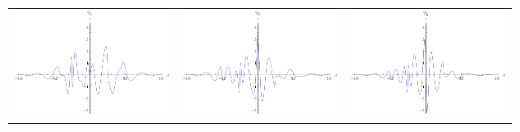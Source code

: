 \documentclass{article}
\begin{document}
\begin{landscape}
\begin{tabular}{ccc}
\includegraphics[width=6.7cm]{octic_wavelet_4.pdf}& \includegraphics[width=6.7cm]{octic_wavelet_5.pdf}& \includegraphics[width=6.7cm]{octic_wavelet_6.pdf} \\
\end{tabular} 
 \end{landscape}
\end{document}
